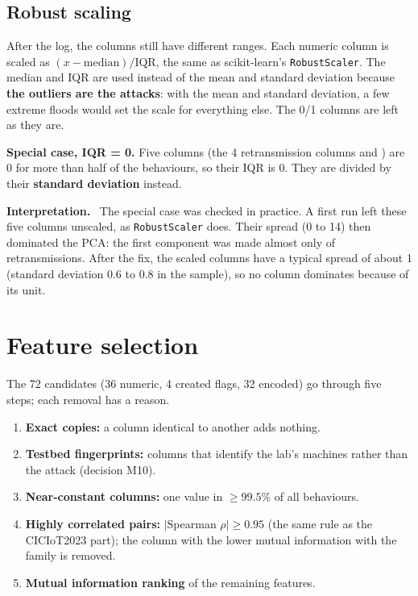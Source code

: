 \documentclass[11pt,a4paper]{article}
\newcommand{\var}[1]{\texttt{\detokenize{#1}}}
\newenvironment{reading}{\par\smallskip\noindent\textbf{\color{navy}Interpretation.}\ }{\par\medskip}
\begin{document}
\subsection{Robust scaling}

After the log, the columns still have different ranges. Each numeric column is scaled as
$(x - \text{median}) / \text{IQR}$, the same as scikit-learn's \texttt{RobustScaler}. The median and IQR are used instead
of the mean and standard deviation because \textbf{the outliers are the attacks}: with the mean and standard deviation, a
few extreme floods would set the scale for everything else. The 0/1 columns are left as they are.

\textbf{Special case, IQR = 0.} Five columns (the 4 retransmission columns and \var{DNS_TTL_ANSWER}) are 0 for more than
half of the behaviours, so their IQR is 0. They are divided by their \textbf{standard deviation} instead.

\begin{reading}
The special case was checked in practice. A first run left these five columns unscaled, as \texttt{RobustScaler} does.
Their spread (0 to 14) then dominated the PCA: the first component was made almost only of retransmissions. After the
fix, the scaled columns have a typical spread of about 1 (standard deviation 0.6 to 0.8 in the sample), so no column
dominates because of its unit.
\end{reading}

\section{Feature selection}

The 72 candidates (36 numeric, 4 created flags, 32 encoded) go through five steps; each removal has a reason.

\begin{enumerate}
  \item \textbf{Exact copies:} a column identical to another adds nothing.
  \item \textbf{Testbed fingerprints:} columns that identify the lab's machines rather than the attack (decision M10).
  \item \textbf{Near-constant columns:} one value in $\geq 99.5\%$ of all behaviours.
  \item \textbf{Highly correlated pairs:} $|$Spearman $\rho| \geq 0.95$ (the same rule as the CICIoT2023 part); the column
        with the lower mutual information with the family is removed.
  \item \textbf{Mutual information ranking} of the remaining features.
\end{enumerate}
\end{document}
